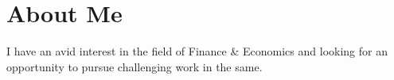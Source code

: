 \documentclass[12pt,a4paper,sans]{moderncv}
\begin{document}
 	\makecvtitle
 	\vspace{-30pt} %
 	\section{\hspace{10em} About Me}{I have an avid interest in the field of Finance \& Economics and looking for an opportunity to pursue challenging work in the same.}	 %
	 \vspace{-10pt} %
	 
	 \vspace{-10pt}
	 
	 \vspace{-10pt} %
	 
	 \vspace{-10pt} %
	 
	 \pagebreak
	 \vspace{-10pt} %
	 
	 \vspace{-10pt} %
	 
	 \vspace{-10pt} %
	 

 
\end{document}

